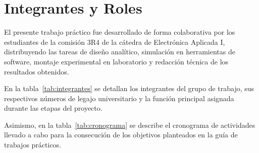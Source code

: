 \chapter{Integrantes y Roles}
\label{chap:integrantes}

El presente trabajo práctico fue desarrollado de forma colaborativa por los estudiantes de la comisión 3R4 de la
cátedra de Electrónica Aplicada I, distribuyendo las tareas de diseño analítico, simulación en herramientas de software,
montaje experimental en laboratorio y redacción técnica de los resultados obtenidos.

En la tabla~\ref{tab:integrantes} se detallan los integrantes del grupo de trabajo, sus respectivos números de legajo
universitario y la función principal asignada durante las etapas del proyecto.

\begin{table}[!ht]
  \centering
  \caption{Nómina de integrantes del grupo de trabajo y distribución de funciones operativas.}
  \label{tab:integrantes}
\end{table}

Asimismo, en la tabla~\ref{tab:cronograma} se describe el cronograma de actividades llevado a cabo para la consecución
de los objetivos planteados en la guía de trabajos prácticos.

\begin{table}[!ht]
  \centering
  \caption{Cronograma cronológico de desarrollo del trabajo práctico.}
  \label{tab:cronograma}
\end{table}
